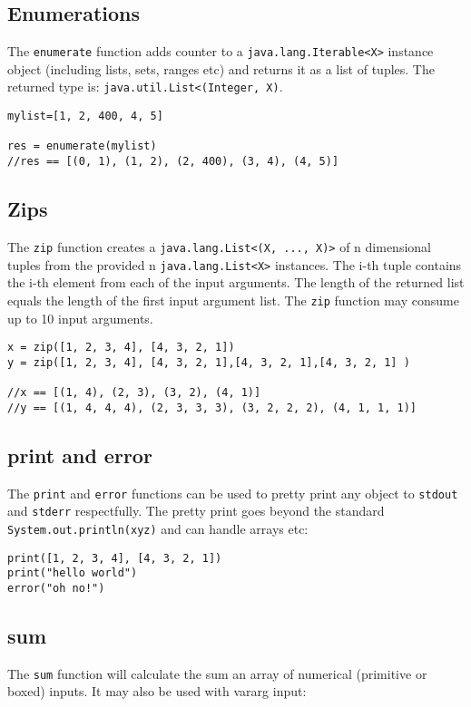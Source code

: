 \documentclass[conc-doc]{subfiles}
\begin{document}
\subsection{Enumerations}
The \lstinline{enumerate} function adds counter to a \lstinline{java.lang.Iterable<X>} instance object (including lists, sets, ranges etc) and returns it as a list of tuples. The returned type is: \lstinline{java.util.List<(Integer, X)}.

\begin{lstlisting}
mylist=[1, 2, 400, 4, 5]

res = enumerate(mylist)
//res == [(0, 1), (1, 2), (2, 400), (3, 4), (4, 5)]
\end{lstlisting}

\subsection{Zips}
The \lstinline{zip} function creates a \lstinline{java.lang.List<(X, ..., X)>} of n dimensional tuples from the provided n \lstinline{java.lang.List<X>} instances. The i-th tuple contains the i-th element from each of the input arguments. The length of the returned list equals the length of the first input argument list. The \lstinline{zip} function may consume up to 10 input arguments.

\begin{lstlisting}
x = zip([1, 2, 3, 4], [4, 3, 2, 1])
y = zip([1, 2, 3, 4], [4, 3, 2, 1],[4, 3, 2, 1],[4, 3, 2, 1] )

//x == [(1, 4), (2, 3), (3, 2), (4, 1)]
//y == [(1, 4, 4, 4), (2, 3, 3, 3), (3, 2, 2, 2), (4, 1, 1, 1)]
\end{lstlisting}



\subsection{print and error}
The \lstinline{print} and \lstinline{error} functions can be used to pretty print any object to \lstinline{stdout} and \lstinline{stderr} respectfully. The pretty print goes beyond the standard \lstinline{System.out.println(xyz)} and can handle arrays etc:

\begin{lstlisting}
print([1, 2, 3, 4], [4, 3, 2, 1])
print("hello world")
error("oh no!")
\end{lstlisting}

\subsection{sum}
The \lstinline{sum} function will calculate the sum an array of numerical (primitive or boxed) inputs. It may also be used with vararg input:
\end{document}
